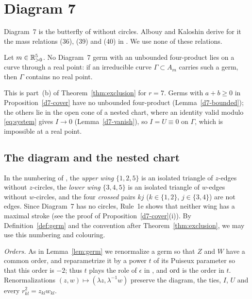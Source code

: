 \section{Diagram 7}\label{sec:d7}

Diagram~7 is the butterfly of \cite[\S7.4]{AK} without circles.  Albouy and Kaloshin derive for
it the mass relations (36), (39) and (40) in \cite[\S\S8.7.1--8.7.3]{AK}.  We use none of these
relations.

\begin{theorem}\label{thm:d7}
Let $m\in\mathbb{R}_{>0}^5$.  No Diagram~7 germ with an unbounded four-product lies on a curve through a
real point: if an irreducible curve $\Gamma\subset A_m$ carries such a germ, then $\Gamma$
contains no real point.
\end{theorem}

This is part~(b) of Theorem~\ref{thm:exclusion} for $r=7$.  Germs with $a+b\ge0$ in
Proposition~\ref{d7-cover} have no unbounded four-product (Lemma~\ref{d7-bounded}); the others
lie in the open cone of a nested chart, where an identity valid modulo \eqref{eq:system} gives
$I\to0$ (Lemma~\ref{d7-vanish}), so $I=U\equiv0$ on $\Gamma$, which is impossible at a real point.

\subsection{The diagram and the nested chart}
In the numbering of \cite[\S8.7]{AK}, the \emph{upper wing} $\{1,2,5\}$ is an isolated triangle
of $z$-edges without $z$-circles, the \emph{lower wing} $\{3,4,5\}$ is an isolated triangle of
$w$-edges without $w$-circles, and the four \emph{crossed} pairs $kj$ ($k\in\{1,2\}$,
$j\in\{3,4\}$) are not edges.
Since Diagram~7 has no circles, Rule~1e shows that neither wing has a maximal stroke (see the
proof of Proposition~\ref{d7-cover}(i)).  By Definition~\ref{def:germ} and the convention after
Theorem~\ref{thm:exclusion}, we may use this numbering and colouring.

\emph{Orders.}  As in Lemma~\ref{lem:germ} we renormalize a germ so that $Z$ and $W$ have a
common order, and reparametrize it by a power $t$ of its Puiseux parameter so that this order is
$-2$; thus $t$ plays the role of $\epsilon$ in \cite[\S3]{AK}, and $\operatorname{ord}$ is the order in $t$.
Renormalizations $(z,w)\mapsto(\lambda z,\lambda^{-1}w)$ preserve the diagram, the ties, $I$, $U$
and every $r_{kl}^2=z_{kl}w_{kl}$.

